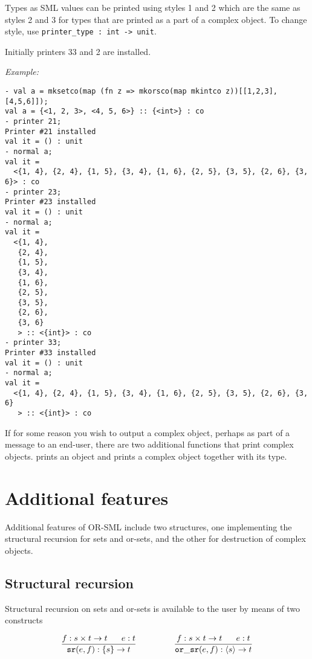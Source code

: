 Types as SML values can be printed using styles 1 and 2 which are the
same as styles 2 and 3 for types that are printed as a part of a
complex object. To change style, use {\tt printer\_type : int ->
unit}. 

Initially printers 33 and 2 are installed. 

{\em Example:}
{\small \begin{verbatim}
- val a = mksetco(map (fn z => mkorsco(map mkintco z))[[1,2,3],[4,5,6]]);
val a = {<1, 2, 3>, <4, 5, 6>} :: {<int>} : co
- printer 21;
Printer #21 installed
val it = () : unit
- normal a;
val it =
  <{1, 4}, {2, 4}, {1, 5}, {3, 4}, {1, 6}, {2, 5}, {3, 5}, {2, 6}, {3, 6}> : co
- printer 23;
Printer #23 installed
val it = () : unit
- normal a;
val it =
  <{1, 4},
   {2, 4},
   {1, 5},
   {3, 4},
   {1, 6},
   {2, 5},
   {3, 5},
   {2, 6},
   {3, 6}
   > :: <{int}> : co
- printer 33;
Printer #33 installed
val it = () : unit
- normal a;
val it =
  <{1, 4}, {2, 4}, {1, 5}, {3, 4}, {1, 6}, {2, 5}, {3, 5}, {2, 6}, {3, 6}
   > :: <{int}> : co
\end{verbatim} }

If for some reason you wish to output a complex object, perhaps as
part of a message to an end-user, there are two additional functions
that print complex objects.  prints an
object and  prints a complex object
together with its type. 


\section{Additional features}

Additional features of OR-SML include two structures, one implementing
the structural recursion for sets and or-sets, and the other for
destruction of complex objects.

\subsection{Structural recursion}

Structural recursion on sets and or-sets is available to the user by
means of two constructs

\newcommand{\sr}{{\tt sr}}
\newcommand{\orsr}{{\tt or\_sr}}

$$ \frac{f:s \times t \to t\;\;\;\;\;\;e:t}{\sr(e,f):\{s\} \to
t}\;\;\;\;\;\;\;\;\;\;\;\;\;\;\;\;
\frac{f:s \times t \to t\;\;\;\;\;\;e:t}{\orsr(e,f):\langle s\rangle \to
t}$$ 

